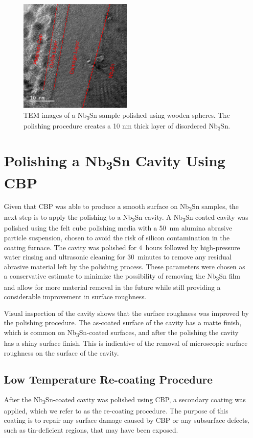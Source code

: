 \documentclass[reprint,amsmath,amssymb,aps]{revtex4-2}%
\begin{document}
\begin{figure}[t]%
\centering%
\includegraphics[width=0.5\textwidth]{../doc/figs/Sample_Surface_Damage_Layer.png}%
\caption{TEM images of a Nb\textsubscript{3}Sn sample polished using wooden spheres. The polishing procedure creates a 10 nm thick layer of disordered Nb\textsubscript{3}Sn.}%
\label{fig:samplesurfacedamagelayer}%
\end{figure}

%
\section{Polishing a Nb\textsubscript{3}Sn Cavity Using CBP}%
\label{sec:cavitycbp}%
Given that CBP was able to produce a smooth surface on Nb\textsubscript{3}Sn samples, the next step is to apply the polishing to a Nb\textsubscript{3}Sn cavity. A Nb\textsubscript{3}Sn-coated cavity was polished using the felt cube polishing media with a 50~nm alumina abrasive particle suspension, chosen to avoid the risk of silicon contamination in the coating furnace. The cavity was polished for 4~hours followed by high-pressure water rinsing and ultrasonic cleaning for 30~minutes to remove any residual abrasive material left by the polishing process. These parameters were chosen as a conservative estimate to minimize the possibility of removing the Nb\textsubscript{3}Sn film and allow for more material removal in the future while still providing a considerable improvement in surface roughness.

Visual inspection of the cavity shows that the surface roughness was improved by the polishing procedure. The as-coated surface of the cavity has a matte finish, which is common on Nb\textsubscript{3}Sn-coated surfaces, and after the polishing the cavity has a shiny surface finish. This is indicative of the removal of microscopic surface roughness on the surface of the cavity.
%
\subsection{Low Temperature Re-coating Procedure}%
\label{subsec:recoating}%
After the Nb\textsubscript{3}Sn-coated cavity was polished using CBP, a secondary coating was applied, which we refer to as the re-coating procedure. The purpose of this coating is to repair any surface damage caused by CBP or any subsurface defects, such as tin-deficient regions, that may have been exposed.
\end{document}
